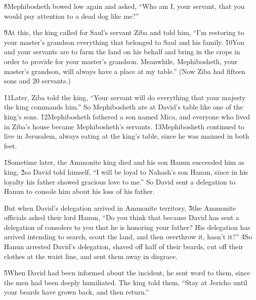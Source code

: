\v{8}Mephibosheth bowed low again and asked, ``Who am I, your servant, that you would pay attention to a dead dog like me?''

\v{9}At this, the king called for Saul's servant Ziba and told him, ``I'm restoring to your master's grandson everything that belonged to Saul and his family. \v{10}You and your servants are to farm the land on his behalf and bring in the crops in order to provide for your master's grandson. Meanwhile, Mephibosheth, your master's grandson, will always have a place at my table.'' (Now Ziba had fifteen sons and 20 servants.)

\v{11}Later, Ziba told the king, ``Your servant will do everything that your majesty the king commands him.'' So Mephibosheth ate at David's table like one of the king's sons. \v{12}Mephibosheth fathered a son named Mica, and everyone who lived in Ziba's house became Mephibosheth's servants. \v{13}Mephibosheth continued to live in Jerusalem, always eating at the king's table, since he was maimed in both feet.

\v{1}Sometime later, the Ammonite king died and his son Hanun succeeded him as king, \v{2}so David told himself, ``I will be loyal to Nahash's son Hanun, since in his loyalty his father showed gracious love to me.'' So David sent a delegation to Hanun to console him about his loss of his father.

But when David's delegation arrived in Ammonite territory, \v{3}the Ammonite officials asked their lord Hanun, ``Do you think that because David has sent a delegation of consolers to you that he is honoring your father? His delegation has arrived intending to search, scout the land, and then overthrow it, hasn't it?'' \v{4}So Hanun arrested David's delegation, shaved off half of their beards, cut off their clothes at the waist line, and sent them away in disgrace.

\v{5}When David had been informed about the incident, he sent word to them, since the men had been deeply humiliated. The king told them, ``Stay at Jericho until your beards have grown back, and then return.''

